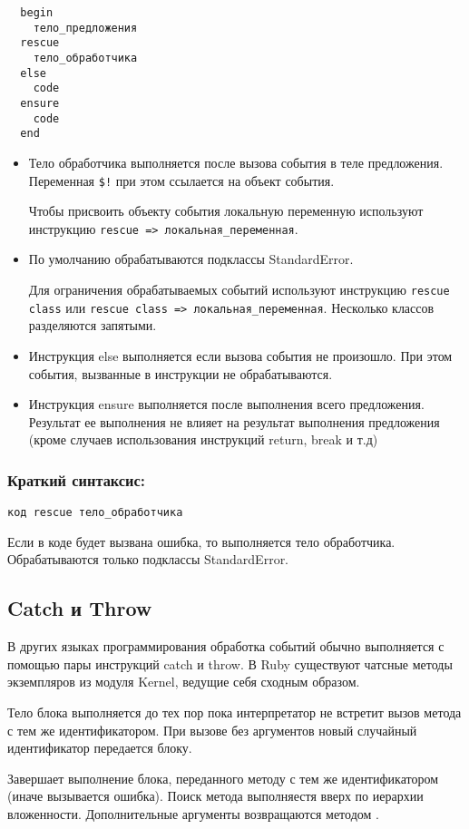 \begin{verbatim}
  begin 
    тело_предложения
  rescue 
    тело_обработчика 
  else 
    code 
  ensure 
    code 
  end
\end{verbatim}

\begin{itemize}
  \item Тело обработчика выполняется после вызова события в теле предложения. Переменная \verb/$!/ при этом ссылается на объект события.
 
  Чтобы присвоить объекту события локальную переменную используют инструкцию \verb!rescue => локальная_переменная!.

  \item По умолчанию обрабатываются подклассы StandardError.

  Для ограничения обрабатываемых событий используют инструкцию \verb!rescue class! или \verb!rescue class => локальная_переменная!. Несколько классов разделяются запятыми.

  \item Инструкция else выполняется если вызова события не произошло. При этом события, вызванные в инструкции не обрабатываются.

  \item Инструкция ensure выполняется после выполнения всего предложения. Результат ее выполнения не влияет на результат выполнения предложения (кроме случаев использования инструкций return, break и т.д)
\end{itemize}

\subsubsection*{Краткий синтаксис:}

\verb!код rescue тело_обработчика!

Если в коде будет вызвана ошибка, то выполняется тело обработчика. Обрабатываются только подклассы StandardError. 

\subsection{Catch и Throw}

В других языках программирования обработка событий обычно выполняется с помощью пары инструкций catch и throw. В Ruby существуют чатсные методы экземпляров из модуля Kernel, ведущие себя сходным образом.

\begin{methodlist}
  Тело блока выполняется до тех пор пока интерпретатор не встретит вызов метода  с тем же идентификатором. При вызове без аргументов новый случайный идентификатор передается блоку.

  Завершает выполнение блока, переданного методу  с тем же идентификатором (иначе вызывается ошибка). Поиск метода выполняестя вверх по иерархии вложенности. Дополнительные аргументы возвращаются методом .
\end{methodlist}